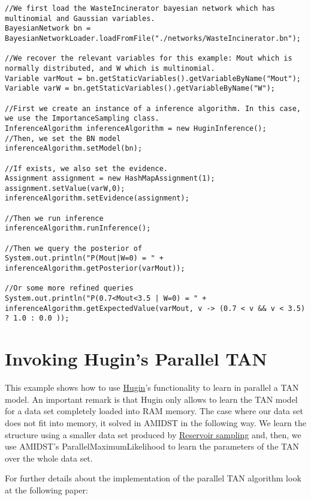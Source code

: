 \begin{lstlisting}
//We first load the WasteIncinerator bayesian network which has multinomial and Gaussian variables.
BayesianNetwork bn = BayesianNetworkLoader.loadFromFile("./networks/WasteIncinerator.bn");

//We recover the relevant variables for this example: Mout which is normally distributed, and W which is multinomial.
Variable varMout = bn.getStaticVariables().getVariableByName("Mout");
Variable varW = bn.getStaticVariables().getVariableByName("W");

//First we create an instance of a inference algorithm. In this case, we use the ImportanceSampling class.
InferenceAlgorithm inferenceAlgorithm = new HuginInference();
//Then, we set the BN model
inferenceAlgorithm.setModel(bn);

//If exists, we also set the evidence.
Assignment assignment = new HashMapAssignment(1);
assignment.setValue(varW,0);
inferenceAlgorithm.setEvidence(assignment);

//Then we run inference
inferenceAlgorithm.runInference();

//Then we query the posterior of
System.out.println("P(Mout|W=0) = " + inferenceAlgorithm.getPosterior(varMout));

//Or some more refined queries
System.out.println("P(0.7<Mout<3.5 | W=0) = " + inferenceAlgorithm.getExpectedValue(varMout, v -> (0.7 < v && v < 3.5) ? 1.0 : 0.0 ));

\end{lstlisting}


\section{Invoking Hugin's Parallel TAN}

This example shows how to use \href{https://www.hugin.com}{Hugin}'s functionality to learn in parallel a TAN model. An important remark is that Hugin only allows to learn the TAN model for a data set completely loaded into RAM memory. The case where our data set does not fit into memory, it solved in AMIDST in the following way. We learn the structure using a smaller data set produced by \href{https://en.wikipedia.org/wiki/Reservoir_sampling}{Reservoir sampling} and, then, we use AMIDST's ParallelMaximumLikelihood to learn the parameters of the TAN over the whole data set.

For further details about the implementation of the parallel TAN algorithm look at the following paper:

